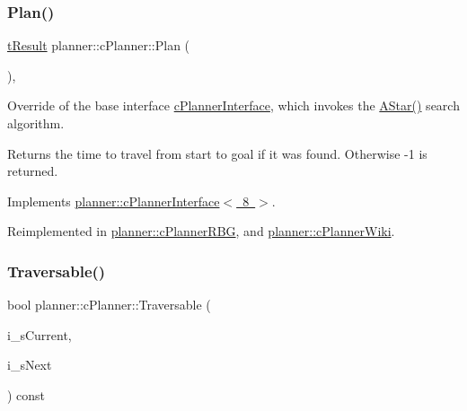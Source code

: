 \subsubsection{\texorpdfstring{Plan()}{Plan()}\hspace{0.1cm}{\footnotesize\ttfamily [2/2]}}
{\footnotesize\ttfamily \mbox{\hyperlink{structt_result}{t\+Result}} planner\+::c\+Planner\+::\+Plan (\begin{DoxyParamCaption}{ }\end{DoxyParamCaption})\hspace{0.3cm}{\ttfamily [override]}, {\ttfamily [virtual]}}



Override of the base interface \mbox{\hyperlink{classplanner_1_1c_planner_interface}{c\+Planner\+Interface}}, which invokes the \mbox{\hyperlink{classplanner_1_1c_planner_a341e70531266f023ac9461d18979d1ef}{A\+Star()}} search algorithm. 

\begin{DoxyReturn}{Returns}
the time to travel from start to goal if it was found. Otherwise -\/1 is returned. 
\end{DoxyReturn}


Implements \mbox{\hyperlink{classplanner_1_1c_planner_interface_a7a06632a8c53906daf39611d9692ffa5}{planner\+::c\+Planner\+Interface$<$ 8 $>$}}.



Reimplemented in \mbox{\hyperlink{classplanner_1_1c_planner_r_b_g_a0bbd752702da582a47dbd153c0065eb5}{planner\+::c\+Planner\+R\+BG}}, and \mbox{\hyperlink{classplanner_1_1c_planner_wiki_a9d18be721400b51162ff463ab11d1721}{planner\+::c\+Planner\+Wiki}}.

\mbox{\label{classplanner_1_1c_planner_ab17c52bf6dd433b8f392a5bf2bc4b9a1}} 
\subsubsection{\texorpdfstring{Traversable()}{Traversable()}\hspace{0.1cm}{\footnotesize\ttfamily [1/2]}}
{\footnotesize\ttfamily bool planner\+::c\+Planner\+::\+Traversable (\begin{DoxyParamCaption}\item[{std\+::shared\+\_\+ptr$<$ \mbox{\hyperlink{structplanner_1_1t_node}{t\+Node}} $>$}]{i\+\_\+s\+Current,  }\item[{std\+::shared\+\_\+ptr$<$ \mbox{\hyperlink{structplanner_1_1t_node}{t\+Node}} $>$}]{i\+\_\+s\+Next }\end{DoxyParamCaption}) const}



